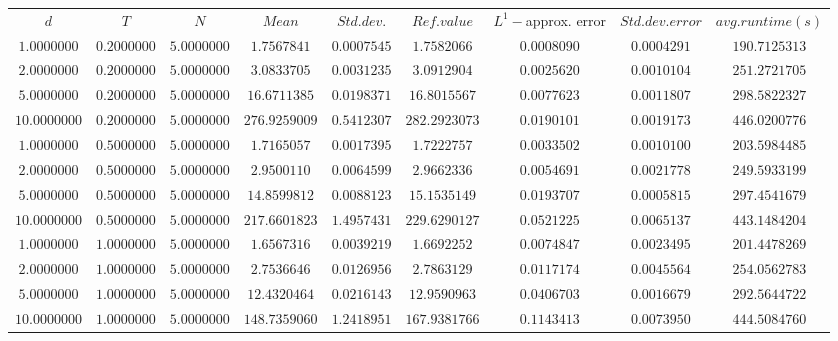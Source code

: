 \begin{tabular}{ccccccccc}
$d$ & $T$ & $N$ & $Mean$ & $Std. dev.$ & $Ref. value$ & $L^1-$approx. error & $Std. dev. error$ & $avg. runtime (s)$\\
$1.0000000$ & $0.2000000$ & $5.0000000$ & $1.7567841$ & $0.0007545$ & $1.7582066$ & $0.0008090$ & $0.0004291$ & $190.7125313$\\
$2.0000000$ & $0.2000000$ & $5.0000000$ & $3.0833705$ & $0.0031235$ & $3.0912904$ & $0.0025620$ & $0.0010104$ & $251.2721705$\\
$5.0000000$ & $0.2000000$ & $5.0000000$ & $16.6711385$ & $0.0198371$ & $16.8015567$ & $0.0077623$ & $0.0011807$ & $298.5822327$\\
$10.0000000$ & $0.2000000$ & $5.0000000$ & $276.9259009$ & $0.5412307$ & $282.2923073$ & $0.0190101$ & $0.0019173$ & $446.0200776$\\
$1.0000000$ & $0.5000000$ & $5.0000000$ & $1.7165057$ & $0.0017395$ & $1.7222757$ & $0.0033502$ & $0.0010100$ & $203.5984485$\\
$2.0000000$ & $0.5000000$ & $5.0000000$ & $2.9500110$ & $0.0064599$ & $2.9662336$ & $0.0054691$ & $0.0021778$ & $249.5933199$\\
$5.0000000$ & $0.5000000$ & $5.0000000$ & $14.8599812$ & $0.0088123$ & $15.1535149$ & $0.0193707$ & $0.0005815$ & $297.4541679$\\
$10.0000000$ & $0.5000000$ & $5.0000000$ & $217.6601823$ & $1.4957431$ & $229.6290127$ & $0.0521225$ & $0.0065137$ & $443.1484204$\\
$1.0000000$ & $1.0000000$ & $5.0000000$ & $1.6567316$ & $0.0039219$ & $1.6692252$ & $0.0074847$ & $0.0023495$ & $201.4478269$\\
$2.0000000$ & $1.0000000$ & $5.0000000$ & $2.7536646$ & $0.0126956$ & $2.7863129$ & $0.0117174$ & $0.0045564$ & $254.0562783$\\
$5.0000000$ & $1.0000000$ & $5.0000000$ & $12.4320464$ & $0.0216143$ & $12.9590963$ & $0.0406703$ & $0.0016679$ & $292.5644722$\\
$10.0000000$ & $1.0000000$ & $5.0000000$ & $148.7359060$ & $1.2418951$ & $167.9381766$ & $0.1143413$ & $0.0073950$ & $444.5084760$\\
\end{tabular}
